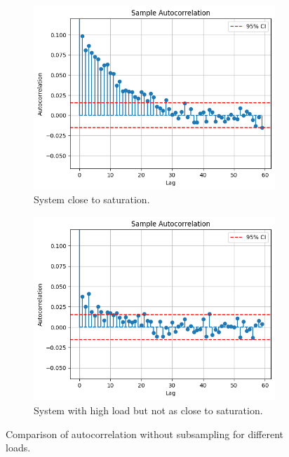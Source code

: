 \begin{figure}[H]
    \captionsetup{type=figure}
    \centering
    \begin{subfigure}[b]{0.45\textwidth}
        \includegraphics[width=\textwidth]{./images/04/autoCorHighUnfix.png}
        \caption{System close to saturation.}
        \label{fig:autoCorHighUnfix}
    \end{subfigure}
    \hfill %
    \begin{subfigure}[b]{0.45\textwidth}
        \includegraphics[width=\textwidth]{./images/04/autoCorLowUnfix.png}
        \caption{System with high load but not as close to saturation.}
        \label{fig:autoCorLowUnfix}
    \end{subfigure}
    \vspace{10pt}
    \caption{Comparison of autocorrelation without subsampling for different loads.}
    \label{fig:autoCorComparisonUnfix}
\end{figure}

